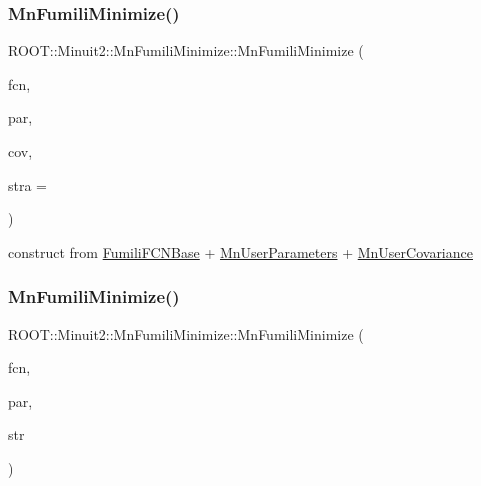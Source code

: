 \subsubsection{\texorpdfstring{MnFumiliMinimize()}{MnFumiliMinimize()}\hspace{0.1cm}{\footnotesize\ttfamily [5/21]}}
{\footnotesize\ttfamily R\+O\+O\+T\+::\+Minuit2\+::\+Mn\+Fumili\+Minimize\+::\+Mn\+Fumili\+Minimize (\begin{DoxyParamCaption}\item[{const \mbox{\hyperlink{classROOT_1_1Minuit2_1_1FumiliFCNBase}{Fumili\+F\+C\+N\+Base}} \&}]{fcn,  }\item[{const \mbox{\hyperlink{classROOT_1_1Minuit2_1_1MnUserParameters}{Mn\+User\+Parameters}} \&}]{par,  }\item[{const \mbox{\hyperlink{classROOT_1_1Minuit2_1_1MnUserCovariance}{Mn\+User\+Covariance}} \&}]{cov,  }\item[{unsigned int}]{stra = {} }\end{DoxyParamCaption})\hspace{0.3cm}{\ttfamily [inline]}}



construct from \mbox{\hyperlink{classROOT_1_1Minuit2_1_1FumiliFCNBase}{Fumili\+F\+C\+N\+Base}} + \mbox{\hyperlink{classROOT_1_1Minuit2_1_1MnUserParameters}{Mn\+User\+Parameters}} + \mbox{\hyperlink{classROOT_1_1Minuit2_1_1MnUserCovariance}{Mn\+User\+Covariance}} 

\mbox{\label{classROOT_1_1Minuit2_1_1MnFumiliMinimize_ad8292150eb4f2642fb583f0cec00ed7b}} 
\subsubsection{\texorpdfstring{MnFumiliMinimize()}{MnFumiliMinimize()}\hspace{0.1cm}{\footnotesize\ttfamily [6/21]}}
{\footnotesize\ttfamily R\+O\+O\+T\+::\+Minuit2\+::\+Mn\+Fumili\+Minimize\+::\+Mn\+Fumili\+Minimize (\begin{DoxyParamCaption}\item[{const \mbox{\hyperlink{classROOT_1_1Minuit2_1_1FumiliFCNBase}{Fumili\+F\+C\+N\+Base}} \&}]{fcn,  }\item[{const \mbox{\hyperlink{classROOT_1_1Minuit2_1_1MnUserParameterState}{Mn\+User\+Parameter\+State}} \&}]{par,  }\item[{const \mbox{\hyperlink{classROOT_1_1Minuit2_1_1MnStrategy}{Mn\+Strategy}} \&}]{str }\end{DoxyParamCaption})\hspace{0.3cm}{\ttfamily [inline]}}



